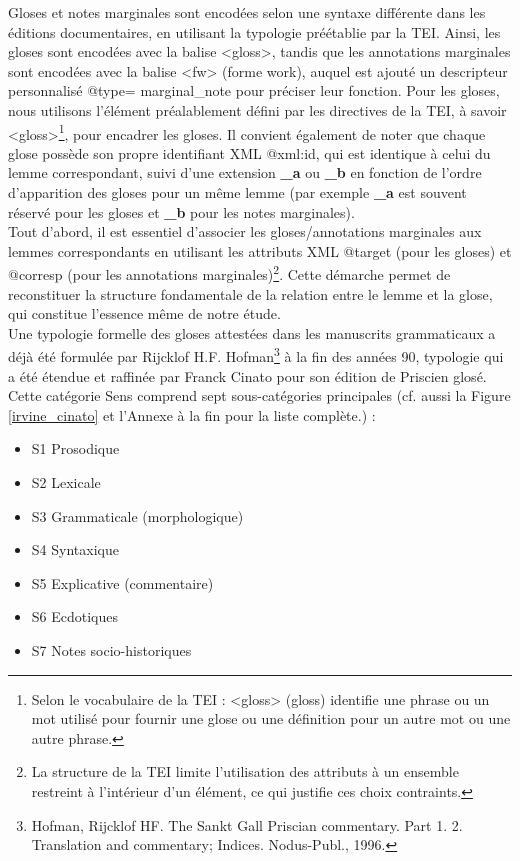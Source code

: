 \documentclass[a4paper, twoside, 12pt]{book}
\begin{document}
Gloses et notes marginales sont encodées selon une syntaxe différente dans les éditions documentaires, en utilisant la typologie préétablie par la TEI. Ainsi, les gloses sont encodées avec la balise <gloss>, tandis que les annotations marginales sont encodées avec la balise <fw> (forme work), auquel est ajouté un descripteur personnalisé @type= marginal\_note pour préciser leur fonction. Pour les gloses, nous utilisons l'élément préalablement défini par les directives de la TEI, à savoir <gloss>\footnote{Selon le vocabulaire de la TEI : <gloss> (gloss) identifie une phrase ou un mot utilisé pour fournir une glose ou une définition pour un autre mot ou une autre phrase.}, pour encadrer les gloses. Il convient également de noter que chaque glose possède son propre identifiant XML @xml:id, qui est identique à celui du lemme correspondant, suivi d'une extension \textbf{\_a} ou \textbf{\_b} en fonction de l'ordre d'apparition des gloses pour un même lemme (par exemple \textbf{\_a} est souvent réservé pour les gloses et \textbf{\_b} pour les notes marginales).\\

Tout d'abord, il est essentiel d'associer les gloses/annotations marginales aux lemmes correspondants en utilisant les attributs XML @target (pour les gloses) et @corresp (pour les annotations marginales)\footnote{La structure de la TEI limite l'utilisation des attributs à un ensemble restreint à l'intérieur d'un élément, ce qui justifie ces choix contraints.}. Cette démarche permet de reconstituer la structure fondamentale de la relation entre le lemme et la glose, qui constitue l'essence même de notre étude.\\

Une typologie formelle des gloses attestées dans les manuscrits grammaticaux a déjà été formulée par Rijcklof H.F. Hofman\footnote{Hofman, Rijcklof HF. The Sankt Gall Priscian commentary. Part 1. 2. Translation and commentary; Indices. Nodus-Publ., 1996.} à la fin des années 90, typologie qui a été étendue et raffinée par Franck Cinato pour son édition de Priscien glosé. Cette catégorie Sens comprend sept sous-catégories principales (cf. aussi la Figure \ref{irvine_cinato} et l'Annexe à la fin pour la liste complète.) :

\begin{itemize}
\item S1 Prosodique
\item S2 Lexicale
\item S3 Grammaticale (morphologique)
\item S4 Syntaxique
\item S5 Explicative (commentaire)
\item S6 Ecdotiques
\item S7 Notes socio-historiques
\end{itemize}
\end{document}
